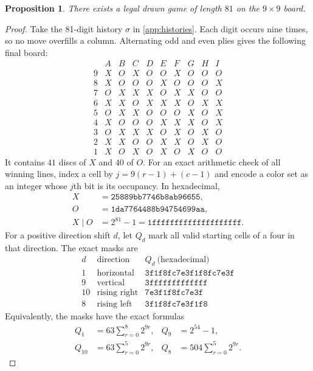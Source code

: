 \documentclass[11pt]{article}
\newtheorem{proposition}[theorem]{Proposition}
\theoremstyle{definition}
\theoremstyle{remark}
\begin{document}
\begin{proposition}\label{prop:draw}
There exists a legal drawn game of length $81$ on the $9\times9$ board.
\end{proposition}
\begin{proof}
Take the 81-digit history $\sigma$ in \cref{app:histories}. Each digit
occurs nine times, so no move overfills a column. Alternating odd and even
plies gives the following final board:
\[
\begin{array}{c|ccccccccc}
 &A&B&C&D&E&F&G&H&I\\\hline
9&X&O&X&O&O&X&O&O&O\\
8&X&O&O&O&X&O&O&O&X\\
7&O&X&X&X&O&X&X&O&O\\
6&X&X&O&X&X&X&O&X&X\\
5&O&X&X&O&O&O&X&O&X\\
4&X&O&O&O&X&X&X&O&X\\
3&O&X&X&X&O&X&O&X&O\\
2&X&X&O&O&X&X&O&X&O\\
1&X&O&X&O&X&O&X&O&O
\end{array}
\]
It contains $41$ discs of $X$ and $40$ of $O$. For an exact arithmetic
check of all winning lines, index a cell by $j=9(r-1)+(c-1)$ and encode
a color set as an integer whose $j$th bit is its occupancy. In hexadecimal,
\begin{align*}
 X&=\mathtt{25889bb7746b8ab96655},\\
 O&=\mathtt{1da7764488b94754699aa},\\
 X\mathbin{\vert}O&=2^{81}-1=\mathtt{1ffffffffffffffffffff}.
\end{align*}
For a positive direction shift $d$, let $Q_d$ mark all valid starting
cells of a four in that direction. The exact masks are
\[
\begin{array}{ccl}
 d&\text{direction}&Q_d\ \text{(hexadecimal)}\\\hline
 1&\text{horizontal}&\mathtt{3f1f8fc7e3f1f8fc7e3f}\\
 9&\text{vertical}&\mathtt{3fffffffffffff}\\
10&\text{rising right}&\mathtt{7e3f1f8fc7e3f}\\
 8&\text{rising left}&\mathtt{3f1f8fc7e3f1f8}
\end{array}
\]
Equivalently, the masks have the exact formulas
\[
\begin{aligned}
 Q_1&=63\sum_{r=0}^{8}2^{9r}, & Q_9&=2^{54}-1,\\
 Q_{10}&=63\sum_{r=0}^{5}2^{9r}, & Q_8&=504\sum_{r=0}^{5}2^{9r}.

\end{aligned}\]
\end{proof}
\end{document}
